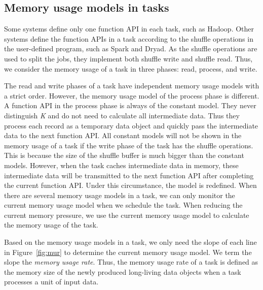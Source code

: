 
\subsection{Memory usage models in tasks}
\label{subsec:taskmodel}

Some systems define only one function API in each task, such as Hadoop. Other systems define the function APIs in a task according to the shuffle operations in the user-defined program, such as Spark and Dryad. As the shuffle operations are used to split the jobs, they implement both shuffle write and shuffle read. Thus, we consider the memory usage of a task in three phases: read, process, and write. 

The read and write phases of a task have independent memory usage models with a strict order. However, the memory usage model of the process phase is different. A function API in the process phase is always of the constant model. They never distinguish  \textit{K} and do not need to calculate all intermediate data. Thus they process each record as a temporary data object and quickly pass the intermediate data to the next function API. All constant models will not be shown in the memory usage of a task if the write phase of the task has the shuffle operations. This is because the size of the shuffle buffer is much bigger than the constant models. However, when the task caches intermediate data in memory, these intermediate data will be transmitted to the next function API after completing the current function API. Under this circumstance, the model is redefined. 
When there are several memory usage models in a task, we can only monitor the current memory usage model when we schedule the task. When reducing the current memory pressure, we use the current memory usage model to calculate the memory usage of the task.

Based on the memory usage models in a task, we only need the slope of each line in Figure~\ref{fig:mur} to determine the current memory usage model. We term the slope the \textit{memory usage rate}. Thus, the memory usage rate of a task is defined as the memory size of the newly produced long-living data objects when a task processes a unit of input data. 

